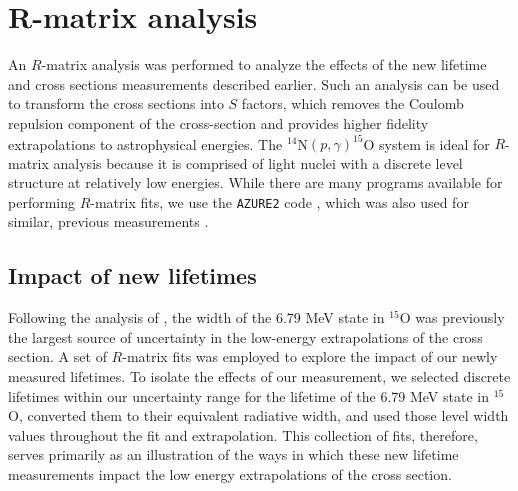 %
%
%
%
%
%
%
%
%
%


%
%


\chapter{R-matrix analysis}
\label{chap: r-matrix}

An $R$-matrix analysis was performed to analyze the effects of the new lifetime and cross sections measurements described earlier. Such an analysis can be used to transform the cross sections into $S$ factors, which removes the Coulomb repulsion component of the cross-section and provides higher fidelity extrapolations to astrophysical energies. The $^{14}$N$(p,\gamma)^{15}$O system is ideal for $R$-matrix analysis because it is comprised of light nuclei with a discrete level structure at relatively low energies. While there are many programs available for performing $R$-matrix fits, we use the \texttt{AZURE2} code \cite{Azuma2010}, which was also used for similar, previous measurements \cite{Li2016}. 

\section{Impact of new lifetimes}
\label{sec: lifetime fit}

Following the analysis of \citet{Li2016}, the width of the 6.79 MeV state in $^{15}$O  was previously the largest source of uncertainty in the low-energy extrapolations of the cross section. A set of $R$-matrix fits was employed to explore the impact of our newly measured lifetimes. To isolate the effects of our measurement, we selected discrete lifetimes within our uncertainty range for the lifetime of the 6.79 MeV state in $^{15}$O, converted them to their equivalent radiative width, and used those level width values throughout the fit and extrapolation. This collection of fits, therefore, serves primarily as an illustration of the ways in which these new lifetime measurements impact the low energy extrapolations of the cross section.

